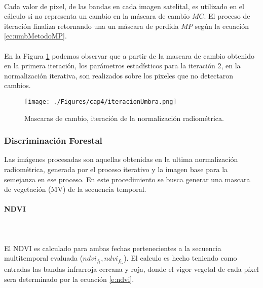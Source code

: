 \\  Cada valor de pixel, de las bandas en cada imagen satelital, es utilizado en el c\'alculo si no representa un cambio en la m\'ascara de cambio $ MC $. El proceso de iteraci\'on finaliza retornando una un m\'ascara de perdida $ MP $ seg\'un la ecuaci\'on \ref{ec:umbMetodoMP}.\\~\\
En la Figura \ref{fig:iteracionRadiometrica} podemos observar que a partir de la mascara de cambio obtenido en la primera iteraci\'on, los par\'ametros estad\'isticos para la iteraci\'on 2, en la normalizaci\'on iterativa, son realizados sobre los pixeles que no detectaron cambios. 
\begin{figure}[H]
	\centering
	\texttt{[image: ./Figures/cap4/iteracionUmbra.png]}
	\caption{Mascaras de cambio, iteraci\'on de la normalizaci\'on radiom\'etrica.}
	\label{fig:iteracionRadiometrica}
\end{figure}


\subsubsection{Discriminaci\'on Forestal}\label{sec:discrForestalMet}
Las im\'agenes procesadas son aquellas obtenidas en la ultima normalizaci\'on radiom\'etrica, generada por el proceso iterativo y la imagen base para la semejanza en ese proceso. En este procedimiento se busca generar una mascara de vegetaci\'on (MV) de la secuencia temporal.
\paragraph{NDVI}\mbox{}\\\mbox{}\\
El NDVI es calculado para ambas fechas pertenecientes a la secuencia multitemporal evaluada ($ndvi_{f_{t}},ndvi_{f_{t_{*}}}  $). El calculo es hecho teniendo como entradas las bandas infrarroja cercana y roja, donde el vigor vegetal de cada p\'ixel sera determinado por la ecuaci\'on \ref{e:ndvi}. 
